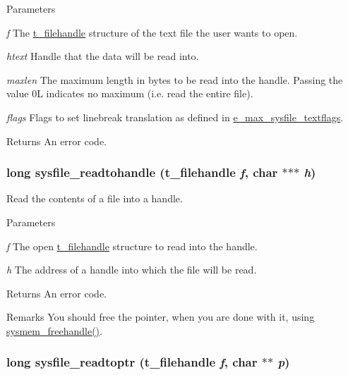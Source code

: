 \begin{DoxyParams}{Parameters}
\item[{\em f}]The \hyperlink{group__files_gafcb776aa74d514754e83b30995b5a5d1}{t\_\-filehandle} structure of the text file the user wants to open. \item[{\em htext}]Handle that the data will be read into. \item[{\em maxlen}]The maximum length in bytes to be read into the handle. Passing the value 0L indicates no maximum (i.e. read the entire file). \item[{\em flags}]Flags to set linebreak translation as defined in \hyperlink{group__files_ga77d70855c1424d078789b0abe6bc94cd}{e\_\-max\_\-sysfile\_\-textflags}. \end{DoxyParams}
\begin{DoxyReturn}{Returns}
An error code. 
\end{DoxyReturn}
\hypertarget{group__files_ga968931fc659e0b0fc13ac29fc1c151b5}{
\subsubsection[{sysfile\_\-readtohandle}]{\setlength{\rightskip}{0pt plus 5cm}long sysfile\_\-readtohandle ({\bf t\_\-filehandle} {\em f}, \/  char $\ast$$\ast$$\ast$ {\em h})}}
\label{group__files_ga968931fc659e0b0fc13ac29fc1c151b5}


Read the contents of a file into a handle. 
\begin{DoxyParams}{Parameters}
\item[{\em f}]The open \hyperlink{group__files_gafcb776aa74d514754e83b30995b5a5d1}{t\_\-filehandle} structure to read into the handle. \item[{\em h}]The address of a handle into which the file will be read. \end{DoxyParams}
\begin{DoxyReturn}{Returns}
An error code. 
\end{DoxyReturn}
\begin{DoxyRemark}{Remarks}
You should free the pointer, when you are done with it, using \hyperlink{group__memory_ga5815994f7d02b77c24f8c684df9acd83}{sysmem\_\-freehandle()}. 
\end{DoxyRemark}
\hypertarget{group__files_gaccf3c95c4a25ea46a54bf082c649675e}{
\subsubsection[{sysfile\_\-readtoptr}]{\setlength{\rightskip}{0pt plus 5cm}long sysfile\_\-readtoptr ({\bf t\_\-filehandle} {\em f}, \/  char $\ast$$\ast$ {\em p})}}
\label{group__files_gaccf3c95c4a25ea46a54bf082c649675e}


